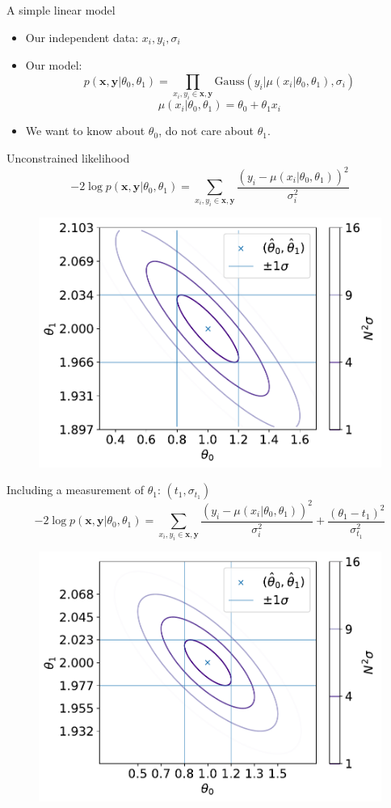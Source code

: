\documentclass[
aspectratio=169,
14pt,
professionalfonts
]{beamer}
\newcommand{\arrow}{~\ding{220}~}
\begin{document}
\begin{frame}{A simple linear model}
    \begin{itemize}
        \item Our independent data: $x_i, y_i, \sigma_i$
        \item Our model:
        $$ p(\mathbf{x}, \mathbf{y}|\theta_0, \theta_1) = \prod_{x_i, y_i \in \mathbf{x}, \mathbf{y}}\text{Gauss}(y_i | \mu(x_i|\theta_0, \theta_1), \sigma_i)$$
        $$\mu(x_i|\theta_0, \theta_1) = \theta_0 + \theta_1 x_i$$
         \item[\arrow] We want to know about $\theta_0$, do not care about $\theta_1$.
    \end{itemize}
\end{frame}

\begin{frame}{Unconstrained likelihood}
\vspace{-1cm}
    $$ -2\log p(\mathbf{x}, \mathbf{y}|\theta_0, \theta_1) = \sum_{x_i, y_i \in \mathbf{x}, \mathbf{y}}\frac{\left(y_i -\mu(x_i|\theta_0, \theta_1)\right)^2}{\sigma_i^2}$$
    \begin{figure}
        \centering
        \includegraphics[width=0.5\linewidth]{../plots/nll_unconstr.pdf}
    \end{figure}
\end{frame}

\begin{frame}{Including a measurement of $\theta_1$: $(t_1, \sigma_{t_1})$}
\vspace{-1cm}
    $$ -2\log p(\mathbf{x}, \mathbf{y}|\theta_0, \theta_1) = \sum_{x_i, y_i \in \mathbf{x}, \mathbf{y}}\frac{\left(y_i -\mu(x_i|\theta_0, \theta_1)\right)^2}{\sigma_i^2} + \frac{\left(\theta_1 -t_1\right)^2}{\sigma_{t_1}^2} $$
    \begin{figure}
        \centering
        \includegraphics[width=0.5\linewidth]{../plots/nll_constr.pdf}
    \end{figure}
\end{frame}
\end{document}
